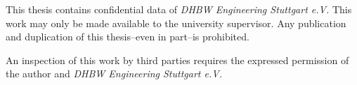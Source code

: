 This thesis contains confidential data of \textit{DHBW Engineering Stuttgart e.V.} This work may only be made available to the university supervisor. Any publication and duplication of this thesis--even in part--is prohibited.

An inspection of this work by third parties requires the expressed permission of the author and \textit{DHBW Engineering Stuttgart e.V.} 